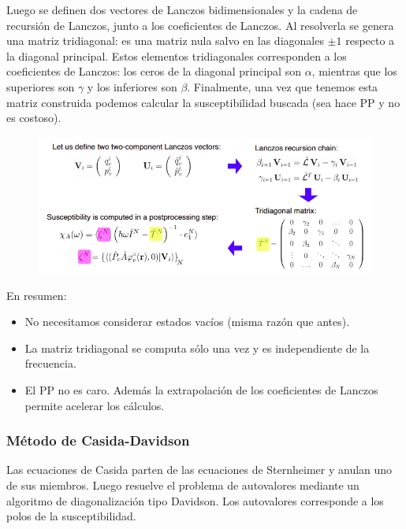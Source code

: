   Luego se definen dos vectores de Lanczos bidimensionales y la cadena de recursión de Lanczos, junto a los coeficientes de Lanczos. Al resolverla se genera una matriz tridiagonal: es una matriz nula salvo en las diagonales $\pm 1$ respecto a la diagonal principal. Estos elementos tridiagonales corresponden a los coeficientes de Lanczos: los ceros de la diagonal principal son $\alpha$, mientras que los superiores son $\gamma$ y los inferiores son $\beta$. Finalmente, una vez que tenemos esta matriz construida podemos calcular la susceptibilidad buscada (sea hace PP y no es costoso).
    \begin{figure}[H]
        \centering
        \includegraphics[scale = 0.6]{figs/D6/Liou_6.png}
    \end{figure}

  En resumen:
    \begin{itemize}
      \item No necesitamos considerar estados vacíos (misma razón que antes).
      \item La matriz tridiagonal se computa sólo una vez y es independiente de la frecuencia.
      \item El PP no es caro. Además la extrapolación de los coeficientes de Lanczos permite acelerar los cálculos.
    \end{itemize}

\subsubsection{Método de Casida-Davidson}

  Las ecuaciones de Casida parten de las ecuaciones de Sternheimer y anulan uno de sus miembros. Luego resuelve el problema de autovalores mediante un algoritmo de diagonalización tipo Davidson. Los autovalores corresponde a los polos de la susceptibilidad.
    \begin{figure}[H]
        \centering
    \end{figure}


